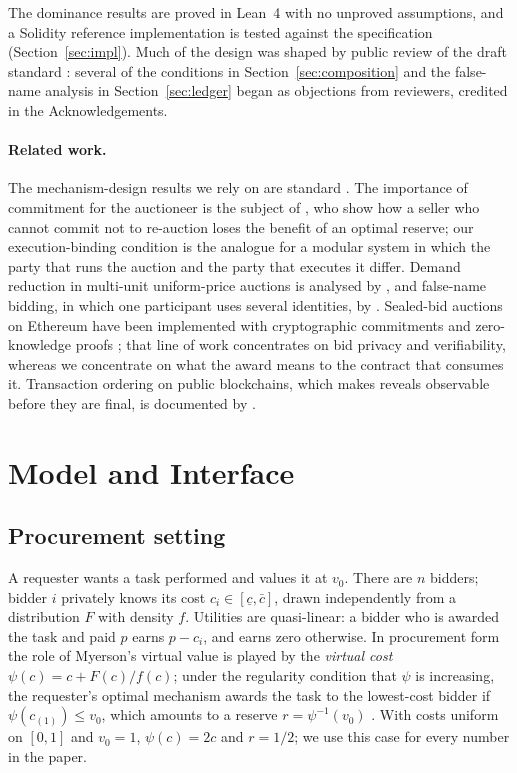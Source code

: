 \documentclass[11pt]{article}
\theoremstyle{definition}
\theoremstyle{remark}
\begin{document}
The dominance results are proved in Lean~4 \citep{demoura2021} with no unproved assumptions, and a Solidity reference implementation is tested against the specification (Section~\ref{sec:impl}). Much of the design was shaped by public review of the draft standard \citep{thread29814}: several of the conditions in Section~\ref{sec:composition} and the false-name analysis in Section~\ref{sec:ledger} began as objections from reviewers, credited in the Acknowledgements.

\paragraph{Related work.} The mechanism-design results we rely on are standard \citep{myerson1981,riley1981,krishna2010,milgrom2004}. The importance of commitment for the auctioneer is the subject of \citet{mcafee1997}, who show how a seller who cannot commit not to re-auction loses the benefit of an optimal reserve; our execution-binding condition is the analogue for a modular system in which the party that runs the auction and the party that executes it differ. Demand reduction in multi-unit uniform-price auctions is analysed by \citet{ausubel2014}, and false-name bidding, in which one participant uses several identities, by \citet{yokoo2004}. Sealed-bid auctions on Ethereum have been implemented with cryptographic commitments and zero-knowledge proofs \citep{galal2018}; that line of work concentrates on bid privacy and verifiability, whereas we concentrate on what the award means to the contract that consumes it. Transaction ordering on public blockchains, which makes reveals observable before they are final, is documented by \citet{daian2020}.

\section{Model and Interface}
\label{sec:model}

\subsection{Procurement setting}

A requester wants a task performed and values it at $v_0$. There are $n$ bidders; bidder $i$ privately knows its cost $c_i \in [\underline{c}, \bar{c}]$, drawn independently from a distribution $F$ with density $f$. Utilities are quasi-linear: a bidder who is awarded the task and paid $p$ earns $p - c_i$, and earns zero otherwise. In procurement form the role of Myerson's virtual value is played by the \emph{virtual cost} $\psi(c) = c + F(c)/f(c)$; under the regularity condition that $\psi$ is increasing, the requester's optimal mechanism awards the task to the lowest-cost bidder if $\psi(c_{(1)}) \le v_0$, which amounts to a reserve $r = \psi^{-1}(v_0)$ \citep{myerson1981}. With costs uniform on $[0,1]$ and $v_0 = 1$, $\psi(c) = 2c$ and $r = 1/2$; we use this case for every number in the paper.
\end{document}
